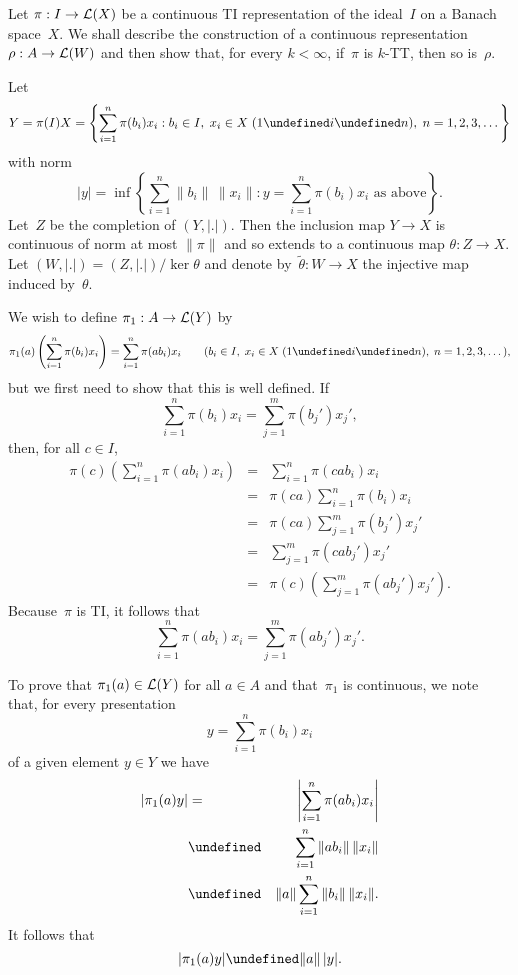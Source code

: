\documentclass[11pt]{article}
\let\leq\undefined  \let\geq\undefined
\let\le\leq   \let\ge\geq
\newenvironment{PoL}{{\it Proof of Lemma. }}{}
\newcommand{\nnY}[1]{|#1|}
\newcommand{\bignnY}[1]{\left|#1\right|}
\newcommand{\LW}{{\cal L}(W)}
\newcommand{\LX}{{\cal L}(X)}
\newcommand{\LY}{{\cal L}(Y)}
\begin{document}
\begin{PoL}
Let $\pi:I\to \LX$ be a continuous TI representation of the ideal~$I$ on a
Banach space~$X$.   We shall describe the construction of a continuous
representation $\rho:A\to\LW$ and then show that, for every $k < \infty$,
if~$\pi$ is $k$-TT, then so is~$\rho$.

Let
$$Y = \pi(I)X = \left\{\sum_{i=1}^n \pi(b_i)x_i:
                    b_i\in I,\; x_i\in X \;(1 \le i \le n),\; n=1,2,3,\dots\right\}$$
with norm
$$\nnY{y} = \inf\left\{\sum_{i=1}^n \|b_i\|\,\|x_i\|:
           y = \sum_{i=1}^n \pi(b_i)x_i  \mbox{ as above}\right\}.$$
Let~$Z$ be the completion of $(Y,\nnY{.})$. Then the inclusion map $Y \to X$ is
continuous of norm at most $\|\pi\|$ and so extends to a continuous map
$\theta:Z \to X$.  Let $(W,\nnY{.}) = (Z,\nnY{.})/\ker\theta$ and denote
by~$\tilde\theta:W \to X$ the injective map induced by~$\theta$.

We wish to define $\pi_1:A \to \LY$ by
$$\pi_1(a)\left(\sum_{i=1}^n \pi(b_i)x_i\right) = \sum_{i=1}^n \pi(ab_i)x_i
                  \qquad(b_i\in I,\; x_i\in X \;(1 \le i \le n),\; n=1,2,3,\dots),$$
but we first need to show that this is well defined.   If
$$\sum_{i=1}^n \pi(b_i)x_i = \sum_{j=1}^m \pi(b_j')x_j',$$
then, for all $c \in I$,
\begin{eqnarray*}
\pi(c)\left(\sum_{i=1}^n \pi(ab_i)x_i\right)
& = & \sum_{i=1}^n\pi(cab_i)x_i \\
& = & \pi(ca)\sum_{i=1}^n\pi(b_i)x_i \\
& = & \pi(ca)\sum_{j=1}^m\pi(b_j')x_j' \\
& = & \sum_{j=1}^m\pi(cab_j')x_j' \\
& = & \pi(c)\left(\sum_{j=1}^m \pi(ab_j')x_j'\right).
\end{eqnarray*}
Because~$\pi$ is TI, it follows that
$$\sum_{i=1}^n \pi(ab_i)x_i = \sum_{j=1}^m \pi(ab_j')x_j'.$$

To prove that $\pi_1(a) \in \LY$ for all $a\in A$ and that~$\pi_1$ is
continuous, we note that, for every presentation
$$y = \sum_{i=1}^n \pi(b_i)x_i$$
of a given element $y \in Y$ we have
\begin{eqnarray*}
\nnY{\pi_1(a)y}
& = & \bignnY{\sum_{i=1}^n \pi(ab_i)x_i} \\
&\le& \sum_{i=1}^n \|ab_i\|\,\|x_i\| \\
&\le& \|a\|\sum_{i=1}^n \|b_i\|\,\|x_i\|.
\end{eqnarray*}
It follows that
$$\nnY{\pi_1(a)y} \le \|a\|\,\nnY{y}.$$


\end{PoL}
\end{document}
